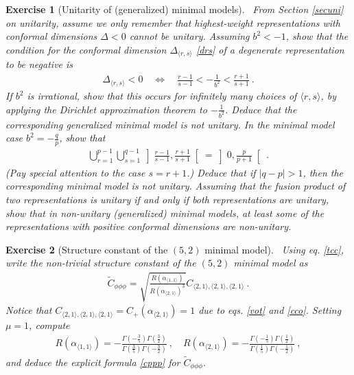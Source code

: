 \documentclass[12pt, a4paper, notitlepage, twoside]{report}
\numberwithin{equation}{section}
\theoremstyle{break}
\newtheorem{exo}{Exercise}[chapter]
\begin{document}
\begin{exo}[Unitarity of (generalized) minimal models]
 ~\label{exoneg}
From Section \ref{secuni} on unitarity, assume we only remember that highest-weight representations with conformal dimensions $\Delta <0$ cannot be unitary. 
Assuming $b^2 < -1$, show that the condition for the conformal dimension $\Delta_{\langle r,s \rangle}$ \eqref{drs} of a degenerate representation to be negative is 
\begin{align}
 \Delta_{\langle r,s \rangle} < 0 \quad \Leftrightarrow \quad \frac{r-1}{s-1} < -\frac{1}{b^2} < \frac{r+1}{s+1} \ .
\end{align}
If $b^2$ is irrational, show that this occurs for infinitely many choices of $\langle r,s \rangle$, by applying the Dirichlet approximation theorem to $-\frac{1}{b^2}$. 
Deduce that the corresponding generalized minimal model is not unitary. 
In the minimal model case $b^2 = -\frac{q}{p}$, show that 
\begin{align}
 \bigcup_{r=1}^{p-1}\bigcup_{s=1}^{q-1} \left] \frac{r-1}{s-1} , \frac{r+1}{s+1} \right[  = \left]0, \frac{p}{p+1}\right[ \ .
\end{align}
(Pay special attention to the case $s=r+1$.) Deduce that if $|q-p|>1$, then the corresponding minimal model is not unitary.
Assuming that the fusion product of two representations is unitary if and only if both representations are unitary, show that in non-unitary (generalized) minimal models, at least some of the representations with positive conformal dimensions are non-unitary.
\end{exo}

\begin{exo}[Structure constant of the $(5,2)$ minimal model]
 ~\label{exocppp}
Using eq. \eqref{tcc}, write the non-trivial structure constant of the $(5,2)$ minimal model as 
\begin{align}
 \tilde{C}_{\phi\phi\phi} = \sqrt{\frac{R(\alpha_{\langle 1,1 \rangle})}{R(\alpha_{\langle 2,1 \rangle})^3}} C_{\langle 2,1\rangle , \langle 2,1 \rangle,\langle 2,1 \rangle}\ .
\end{align}
Notice that $C_{\langle 2,1\rangle , \langle 2,1 \rangle,\langle 2,1 \rangle} = C_+(\alpha_{\langle 2,1 \rangle})=1$ due to eqs. \eqref{vot} and \eqref{cco}.
Setting $\mu=1$, compute
\begin{align}
 R(\alpha_{\langle 1,1 \rangle}) = -\frac{\Gamma(-\frac35)\Gamma(\frac32)}{\Gamma(\frac35)\Gamma(-\frac32)} \ , \quad R(\alpha_{\langle 2,1 \rangle}) = -\frac{\Gamma(-\frac15)\Gamma(\frac12)}{\Gamma(\frac15)\Gamma(-\frac12)}\ , 
\end{align}
and deduce the explicit formula \eqref{cppp} for $\tilde{C}_{\phi\phi\phi}$.
\end{exo}
\end{document}
